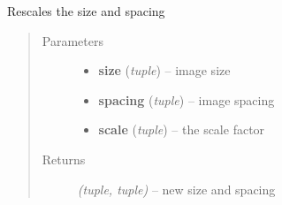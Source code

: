 \documentclass[letterpaper,10pt,english]{sphinxmanual}
\begin{document}
\begin{fulllineitems}
\label{api/ClearMap.Alignment:ClearMap.Alignment.Elastix.rescaleSizeAndSpacing}
Rescales the size and spacing
\begin{quote}\begin{description}
\item[{Parameters}] \leavevmode\begin{itemize}
\item {} 
\textbf{size} (\emph{tuple}) --
image size

\item {} 
\textbf{spacing} (\emph{tuple}) --
image spacing

\item {} 
\textbf{scale} (\emph{tuple}) --
the scale factor

\end{itemize}

\item[{Returns}] \leavevmode
\emph{(tuple, tuple)} --
new size and spacing

\end{description}\end{quote}

\end{fulllineitems}

\end{document}
